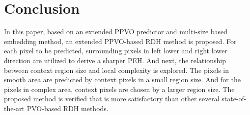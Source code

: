 \documentclass[review,3p,10pt,sort&compress]{elsarticle}
\begin{document}
\begin{table}
\centering
\caption{Comparison of PSNR (dB) among the proposed method and the PVO-based methods of Peng \emph{et al.} \cite{Peng2014IPVO}, Ou \emph{et al.} \cite{Ou2014PVOk} and Qu \emph{et al.} \cite{Qu2015PPVO}. The embedding capacity is 20,000 bits.}
\label{tab:20000bits}
\end{table}

\section{Conclusion}\label{sec:5}
In this paper, based on an extended PPVO predictor and multi-size based embedding method, an extended PPVO-based RDH method is proposed. For each pixel to be predicted, surrounding pixels in left lower and right lower direction are utilized to derive a sharper PEH. And next, the relationship between context region size and local complexity is explored. The pixels in smooth area are predicted by context pixels in a small region size. And for the pixels in complex area, context pixels are chosen by a larger region size. The proposed method is verified that is more satisfactory than other several state-of-the-art PVO-based RDH methods.
\end{document}
